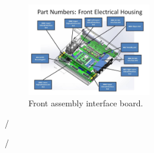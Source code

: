 \begin{figure}
	\centering
	\includegraphics[width=0.48\textwidth]{./pictures/pcb.jpg}
	\caption{Front assembly interface board.}
	\label{fig:pcb}
\end{figure}


/%

/%